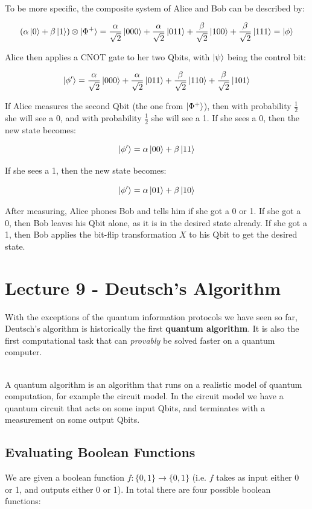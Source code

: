 \documentclass[12pt]{article}
\begin{document}
\noindent
\\
To be more specific, the composite system of Alice and Bob can be described by:

\[ \left( \alpha \ket{0} + \beta \ket{1} \right) \otimes \ket{\Phi^+} = \frac{\alpha}{\sqrt{2}}\ket{000} + \frac{\alpha}{\sqrt{2}}\ket{011} + \frac{\beta}{\sqrt{2}}\ket{100} + \frac{\beta}{\sqrt{2}}\ket{111} = \ket{\phi} \]

\noindent
Alice then applies a CNOT gate to her two Qbits, with $\ket{\psi}$ being the control bit:

\[ \ket{\phi^\prime} = \frac{\alpha}{\sqrt{2}}\ket{000} + \frac{\alpha}{\sqrt{2}}\ket{011} + \frac{\beta}{\sqrt{2}}\ket{110} + \frac{\beta}{\sqrt{2}}\ket{101} \]

\noindent
If Alice measures the second Qbit (the one from $\ket{\Phi^+}$), then with probability $\frac{1}{2}$ she will see a 0, and with probability $\frac{1}{2}$ she will see a 1.
If she sees a 0, then the new state becomes:

\[ \ket{\phi^\prime} = \alpha \ket{00} + \beta \ket{11} \]

\noindent
If she sees a 1, then the new state becomes:

\[ \ket{\phi^\prime} = \alpha \ket{01} + \beta \ket{10} \]

\noindent
After measuring, Alice phones Bob and tells him if she got a 0 or 1.
If she got a 0, then Bob leaves his Qbit alone, as it is in the desired state already.
If she got a 1, then Bob applies the bit-flip transformation $X$ to his Qbit to get the desired state.

%
%
\newpage
\section*{Lecture 9 - Deutsch's Algorithm}
With the exceptions of the quantum information protocols we have seen so far, Deutsch's algorithm is historically the first \textbf{quantum algorithm}.
It is also the first computational task that can \textit{provably} be solved faster on a quantum computer.

\noindent
\\
A quantum algorithm is an algorithm that runs on a realistic model of quantum computation, for example the circuit model.
In the circuit model we have a quantum circuit that acts on some input Qbits, and terminates with a measurement on some output Qbits.

\subsection*{Evaluating Boolean Functions}
We are given a boolean function $f:\{ 0, 1 \} \rightarrow \{ 0, 1 \}$ (i.e. $f$ takes as input either 0 or 1, and outputs either 0 or 1).
In total there are four possible boolean functions:
\end{document}
